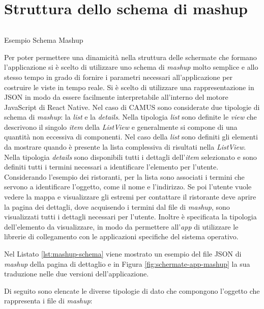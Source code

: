 \section{Struttura dello schema di mashup\label{sec:struttura-schemi-mashup}}

\begin{listing}[t]
	\inputminted{json}{6-implementazione-app/Codice/mashup-schema-example-app.json}
	\caption{Esempio Schema Mashup}
	\label{lst:mashup-schema}
\end{listing}

Per poter permettere una dinamicità nella struttura delle schermate che formano l'applicazione si è scelto di utilizzare uno schema di \emph{mashup} molto semplice e allo stesso tempo in grado di fornire i parametri necessari all'applicazione per costruire le viste in tempo reale. Si è scelto di utilizzare una rappresentazione in JSON in modo da essere facilmente interpretabile all'interno del motore JavaScript di React Native. 
Nel caso di CAMUS sono considerate due tipologie di schema di \emph{mashup}: la \emph{list} e la \emph{details}. 
Nella tipologia \emph{list} sono definite le \emph{view} che descrivono il singolo \emph{item} della \emph{ListView} e generalmente si compone di una quantità non eccessiva di componenti. 
Nel caso della \emph{list} sono definiti gli elementi da mostrare quando è presente la lista complessiva di risultati nella \emph{ListView}.
Nella tipologia \emph{details} sono disponibili tutti i dettagli dell'\emph{item} selezionato e sono definiti tutti i termini necessari a identificare l'elemento per l'utente.
Considerando l'esempio dei ristoranti, per la lista sono associati i termini che servono a identificare l'oggetto, come il nome e l'indirizzo. Se poi l'utente vuole vedere la mappa e visualizzare gli estremi per contattare il ristorante deve aprire la pagina dei dettagli, dove acquisendo i termini dal file di \emph{mashup}, sono visualizzati tutti i dettagli necessari per l'utente. Inoltre è specificata la tipologia dell'elemento da visualizzare, in modo da permettere all'\emph{app} di utilizzare le librerie di collegamento con le applicazioni specifiche del sistema operativo.

Nel Listato \ref{lst:mashup-schema} viene mostrato un esempio del file JSON di \emph{mashup} della pagina di dettaglio e in Figura \ref{fig:schermate-app-mashup} la sua traduzione nelle due versioni dell'applicazione.

Di seguito sono elencate le diverse tipologie di dato che compongono l'oggetto che rappresenta i file di \emph{mashup}:

